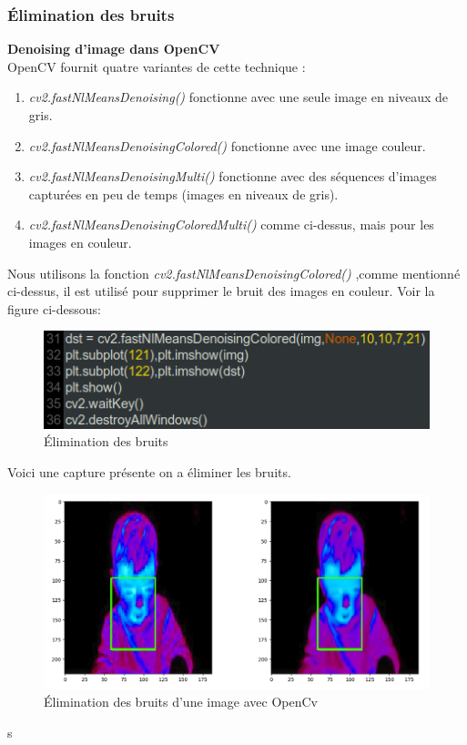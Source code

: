 \documentclass[12pt]{article}
\begin{document}
\subsubsection*{\' Elimination des bruits}
\textbf{Denoising d'image dans OpenCV}\\

OpenCV fournit quatre variantes de cette technique :
\begin{enumerate}
	\item \textit{cv2.fastNlMeansDenoising()} fonctionne avec une seule image en niveaux de gris.
	\item \textit{cv2.fastNlMeansDenoisingColored()} fonctionne avec une image couleur.
	\item \textit{cv2.fastNlMeansDenoisingMulti()} fonctionne avec des séquences d'images capturées en peu de temps (images en niveaux de gris).
	\item \textit{cv2.fastNlMeansDenoisingColoredMulti()} comme ci-dessus, mais pour les images en couleur.
\end{enumerate}

Nous utilisons la fonction \textit{cv2.fastNlMeansDenoisingColored()} ,comme mentionné ci-dessus, il est utilisé pour supprimer le bruit des images en couleur. Voir la figure ci-dessous:
\begin{figure}[h]
	\centering
	\includegraphics[width=15cm]{img-Chapiter-4/elimination.png}
	\caption{\' Elimination des bruits}
\end{figure}

Voici une capture présente on a éliminer les bruits.
\begin{figure}[h]
	\centering
	\includegraphics[width=14cm]{img-Chapiter-4/elicapture.png}
	\caption{\' Elimination des bruits d'une image avec OpenCv}
\end{figure}
s
\newpage
\end{document}
